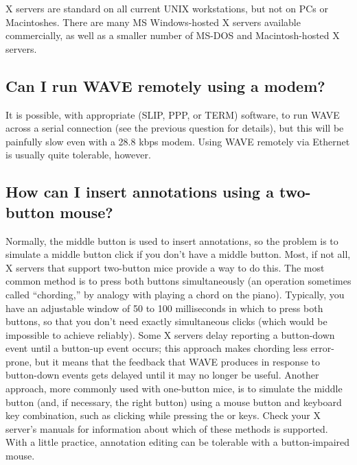 \documentclass[twoside]{book}
\newcommand{\keycap}[1]{\cornersize{.5}\Ovalbox{\small\sf #1}}
\newcommand{\WAVE}{{\sf WAVE}\xspace}
\begin{document}
X servers are standard on all current UNIX workstations, but not on
PCs or Macintoshes.  There are many MS Windows-hosted X servers
available commercially, as well as a smaller number of MS-DOS and
Macintosh-hosted X servers.

\subsection{Can I run \WAVE{} remotely using a modem?}

It is possible, with appropriate (SLIP, PPP, or TERM) software, to run
\WAVE{} across a serial connection (see the previous question for
details), but this will be painfully slow even with a 28.8 kbps modem.
Using \WAVE{} remotely via Ethernet is usually quite tolerable,
however.

\subsection{How can I insert annotations using a two-button mouse?}

Normally, the middle button is used to insert annotations, so the problem is
to simulate a middle button click if you don't have a middle button.
Most, if not all, X servers that support two-button mice provide a way to do
this.  The most common method is to press both buttons simultaneously (an
operation sometimes called ``chording,'' by analogy with playing a chord on
the piano).  Typically, you have an adjustable window of 50 to 100 milliseconds
in which to press both buttons, so that you don't need exactly simultaneous
clicks (which would be impossible to achieve reliably).  Some X servers delay
reporting a button-down event until a button-up event occurs;  this approach
makes chording less error-prone, but it means that the feedback that \WAVE{} 
produces in response to button-down events gets delayed until it may no longer
be useful.  Another approach, more commonly used with one-button mice, is to
simulate the middle button (and, if necessary, the right button) using a
mouse button and keyboard key combination, such as clicking while pressing the
\keycap{SHIFT} or \keycap{CTRL} keys.  Check your X server's manuals for
information about which of these methods is supported.  With a little practice,
annotation editing can be tolerable with a button-impaired mouse.
\end{document}
